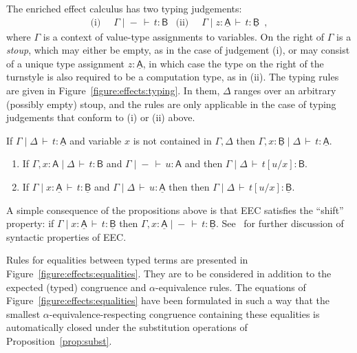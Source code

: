 \documentclass{LMCS}
\newcommand{\comptype}[1]{\underline{#1}}
\newcommand{\VA}{\mathsf{A}}
\newcommand{\VB}{\mathsf{B}}
\newcommand{\CA}{\comptype{\mathsf{A}}}
\newcommand{\CB}{\comptype{\mathsf{B}}}
\newcommand{\In}[2]{#1 \colon  \! #2}
\newcommand{\rIn}[2]{#1 \colon  #2}
\newcommand{\Cj}[4]{#1 \mid  \! #2 \, \vdash \, \rIn{#3}{#4}}
\newcommand{\Vj}[3]{\Cj{#1}{{-}}{#2}{#3}}
\begin{document}
The enriched effect calculus has two typing judgements:
\begin{align*}
\text{(i)} \; \; & \Vj{\Gamma}{t}{\VB} 
& 
\text{(ii)} \; \; & \Cj{\Gamma}{\In{z}{\CA}}{t}{\CB} \enspace ,
\end{align*}
where $\Gamma$ is a context of value-type assignments to variables. On the right of $\Gamma$ is
a \emph{stoup}, which may either be empty, as in the case of judgement (i), or may
consist of a unique type assignment $\In{z}{\CA}$, in which case the type on the right of the
turnstyle is also required to be a computation type, as in (ii).
The typing rules are given in Figure~\ref{figure:effects:typing}. In them, $\Delta$ ranges over an
arbitrary (possibly empty) stoup, and the rules are only applicable in the case
of typing judgements that conform to (i) or (ii) above. 

\begin{prop}[Weakening]
\leavevmode
\label{prop:weak}
If $\Cj{\Gamma}{\Delta}{t}{\CA}$  and variable $x$ is not contained in $\Gamma,\Delta$
then $\Cj{\Gamma,\In{x}{\CB}}{\Delta}{t}{\CA}$.
\end{prop}
\begin{prop}[Substitution]
\label{prop:subst}
\leavevmode
\begin{enumerate}[\em(1)]
\item \label{subst:i}
If $\Cj{\Gamma, \In{x}{\VA}}{\Delta}{t}{\VB}$ and  $\Vj{\Gamma}{u}{\VA}$ and 
then $\Cj{\Gamma}{\Delta}{t[u/x]}{\VB}$.
\item \label{subst:ii}
If $\Cj{\Gamma}{\In{x}{\CA}}{t}{\CB}$ and $\Cj{\Gamma}{\Delta}{u}{\CA}$ then
then $\Cj{\Gamma}{\Delta}{t[u/x]}{\CB}$.
\end{enumerate}
\end{prop}

\noindent
A simple consequence of the propositions above is that EEC satisfies the
``shift'' property: if $\Cj{\Gamma}{\In{x}{\CA}}{t}{\CB}$ then 
$\Vj{\Gamma, \In{x}{\CA}}{t}{\CB}$. 
See~\cite{EMSb} for further discussion of syntactic properties of
EEC.


Rules for equalities between typed terms are presented in
Figure~\ref{figure:effects:equalities}. They are to be considered in
addition to the expected (typed) congruence and $\alpha$-equivalence rules.
The equations of Figure~\ref{figure:effects:equalities} have been formulated in
such a way that the smallest $\alpha$-equivalence-respecting congruence 
containing these equalities is automatically closed under 
the substitution operations of Proposition~\ref{prop:subst}.
\end{document}
